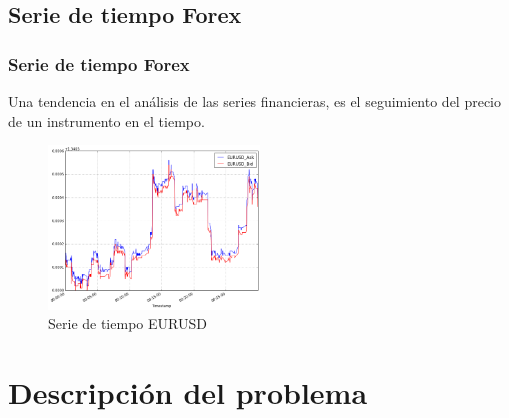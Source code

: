 \documentclass{beamer}
\begin{document}
        \subsection{Serie de tiempo Forex}
            \begin{frame}
            \frametitle{Serie de tiempo Forex}
            Una tendencia en el análisis de las series financieras, es el seguimiento del
            precio de un instrumento en el tiempo.
            \begin{figure}[h!t]
                \begin{center}
                    \includegraphics[width=0.5\textwidth]{img/eurusd}
                    \caption{Serie de tiempo EURUSD}
                    \label{fig:microsoft}
                \end{center}
            \end{figure}

            \end{frame}
    \section{Descripción del problema}
\end{document}
